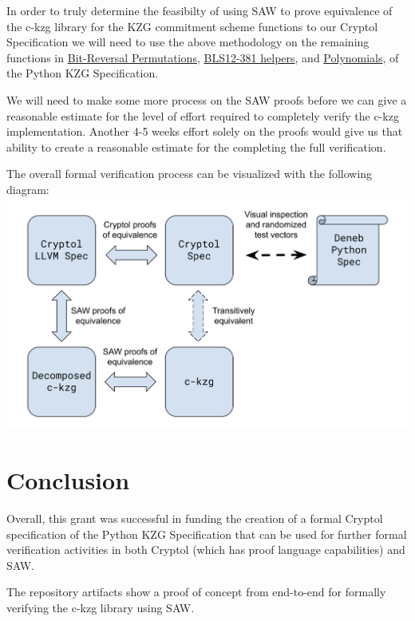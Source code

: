 \documentclass[12pt]{galois-whitepaper}
\begin{document}
In order to truly determine the feasibilty of using SAW to prove equivalence of the c-kzg library for the KZG commitment
scheme functions to our Cryptol Specification we will need to use the above methodology on the remaining functions in
\href{https://github.com/ethereum/consensus-specs/blob/68d32accf945a84f69d4c779cb6c71223a311eac/specs/deneb/polynomial-commitments.md\#bit-reversal-permutation}{Bit-Reversal Permutations},
\href{https://github.com/ethereum/consensus-specs/blob/68d32accf945a84f69d4c779cb6c71223a311eac/specs/deneb/polynomial-commitments.md\#bls12-381-helpers}{BLS12-381 helpers},
and \href{https://github.com/ethereum/consensus-specs/blob/68d32accf945a84f69d4c779cb6c71223a311eac/specs/deneb/polynomial-commitments.md#polynomials}{Polynomials},
of the Python KZG Specification.

We will need to make some more process on the SAW proofs before we can give a reasonable estimate
for the level of effort required to completely verify the c-kzg implementation. Another 4-5 weeks
effort solely on the proofs would give us that ability to create a reasonable estimate for the
completing the full verification.

The overall formal verification process can be visualized with the following diagram:
\includegraphics[width=\textwidth]{Proof-Equivalence-Diagram.png}

\section{Conclusion}

Overall, this grant was successful in funding the creation of a formal Cryptol specification of
the Python KZG Specification that can be used for further formal verification activities in both
Cryptol (which has proof language capabilities) and SAW.

The repository artifacts show a proof of concept from end-to-end for formally verifying the c-kzg
library using SAW.
\end{document}
